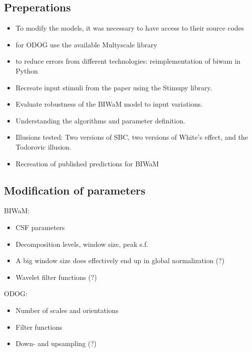 
\subsection*{Preperations}

\begin{itemize}
    \item To modify the models, it was necessary to have access to their source codes
    \item for ODOG use the available Multyscale library
    \item to reduce errors from different technologies: reimplementation of biwam in Python
    \item Recreate input stimuli from the paper using the Stimupy library.
    \item Evaluate robustness of the BIWaM model to input variations.
    \item Understanding the algorithms and parameter definition.
    \item Illusions tested: Two versions of SBC, two versions of White’s effect, and the Todorovic illusion.
    \item Recreation of published predictions for BIWaM
\end{itemize}

\subsection*{Modification of parameters}
BIWaM:
\begin{itemize} 
    \item CSF parameters
    \item Decomposition levels, window size, peak s.f.
    \item A big window size does effectively end up in global normalization (?)
    \item Wavelet filter functions (?)
\end{itemize}
ODOG:
\begin{itemize} 
    \item Number of scales and orientations 
    \item Filter functions
    \item Down- and upsampling (?)
\end{itemize}

